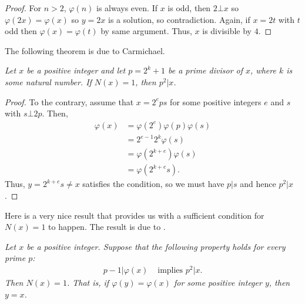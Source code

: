 \documentclass[main.tex]{subfile}
\begin{document}
		\begin{proof}
			For $n>2$, $\varphi(n)$ is always even. If $x$ is odd, then $2\bot x$ so $\varphi(2x)=\varphi(x)$ so $y=2x$ is a solution, so contradiction. Again, if $x=2t$ with $t$ odd then $\varphi(x)=\varphi(t)$ by same argument. Thus, $x$ is divisible by $4$.
		\end{proof}
	The following theorem is due to Carmichael.

		\begin{theorem} \slshape
			Let $x$ be a positive integer and let $p=2^k+1$ be a prime divisor of $x$, where $k$ is some natural number. If $N(x)=1$, then $p^2|x$.
		\end{theorem}

		\begin{proof}
			To the contrary, assume that $x=2^eps$ for some positive integers $e$ and $s$ with $s\bot 2p$. Then,
				\begin{align*}
					\varphi(x)  & = \varphi(2^e)\varphi(p)\varphi(s)\\
							& = 2^{e-1}2^k\varphi(s)\\
							& = \varphi(2^{k+e})\varphi(s)\\
							& = \varphi(2^{k+e}s).
				\end{align*}
			Thus, $y=2^{k+e}s\neq x$ satisfies the condition, so we must have $p|s$ and hence $p^2 | x$.
		\end{proof}
	Here is a very nice result that provides us with a sufficient condition for $N(x)=1$ to happen. The result is due to \textcite{pomerance_1974}.
		\begin{theorem}\slshape
			 Let $x$ be a positive integer. Suppose that the following property holds for every prime $p$:
				\begin{align*}
					p-1|\varphi(x)& \text{ implies } p^2|x.
				\end{align*}
			Then $N(x)=1$. That is, if $\varphi(y)=\varphi(x)$ for some positive integer $y$, then $y=x$.
		\end{theorem}
\end{document}
